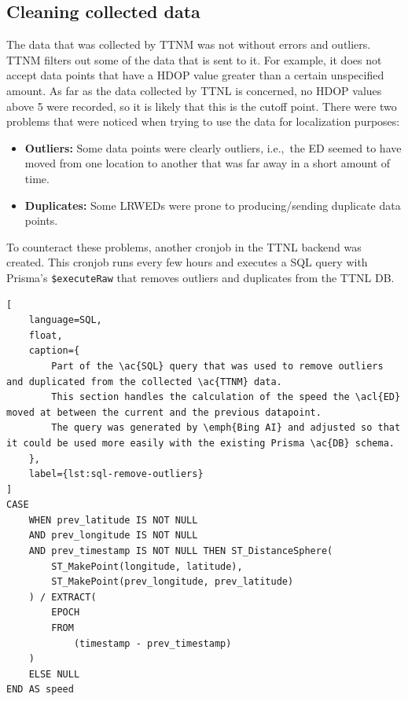 \subsection{Cleaning collected data}\label{subsec:cleaning-collected-data}

The data that was collected by \ac{TTNM} was not without errors and outliers.
\ac{TTNM} filters out some of the data that is sent to it.
For example, it does not accept data points that have a \ac{HDOP} value greater than a certain unspecified amount.
As far as the data collected by \ac{TTNL} is concerned, no \ac{HDOP} values above 5 were recorded, so it is likely that this is the cutoff point.
There were two problems that were noticed when trying to use the data for localization purposes:

\begin{itemize}
    \item \textbf{Outliers:} Some data points were clearly outliers, i.e.,\ the \acl{ED} seemed to have moved from one location to another that was far away in a short amount of time.
    \item \textbf{Duplicates:} Some \aclp{LRWED} were prone to producing/sending duplicate data points.
\end{itemize}

To counteract these problems, another cronjob in the \ac{TTNL} backend was created.
This cronjob runs every few hours and executes a \ac{SQL} query with Prisma's \lstinline|$executeRaw| that removes outliers and duplicates from the \ac{TTNL} \ac{DB}.

\begin{lstlisting}[
    language=SQL,
    float,
    caption={
        Part of the \ac{SQL} query that was used to remove outliers and duplicated from the collected \ac{TTNM} data.
        This section handles the calculation of the speed the \acl{ED} moved at between the current and the previous datapoint.
        The query was generated by \emph{Bing AI} and adjusted so that it could be used more easily with the existing Prisma \ac{DB} schema.
    },
    label={lst:sql-remove-outliers}
]
CASE
    WHEN prev_latitude IS NOT NULL
    AND prev_longitude IS NOT NULL
    AND prev_timestamp IS NOT NULL THEN ST_DistanceSphere(
        ST_MakePoint(longitude, latitude),
        ST_MakePoint(prev_longitude, prev_latitude)
    ) / EXTRACT(
        EPOCH
        FROM
            (timestamp - prev_timestamp)
    )
    ELSE NULL
END AS speed
\end{lstlisting}

